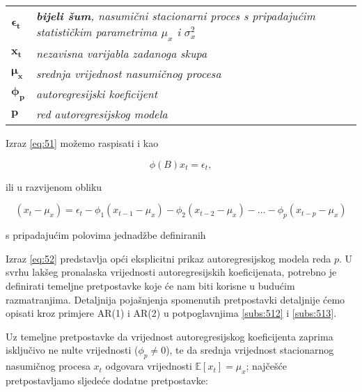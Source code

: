 \documentclass[a4paper,12pt,oneside]{memoir}
\begin{document}
            \begin{table}[H]
                \centering
                \begin{tabular*}{0.9\textwidth}{>{\bfseries}l p{13cm}}
                    \textit{\textbf{$\boldsymbol{\epsilon_t}$}} & \textit{\textbf{bijeli šum}, nasumični stacionarni proces s pripadajućim statističkim parametrima $\mu_x$ i $\sigma_x^2$}\\
                    \textit{\textbf{$\boldsymbol{x_t}$}} & \textit{nezavisna varijabla zadanoga skupa}\\
                    \textit{\textbf{$\boldsymbol{\mu_x}$}} & \textit{srednja vrijednost nasumičnog procesa}\\
                    \textit{\textbf{$\boldsymbol{\phi_p}$}} & \textit{autoregresijski koeficijent}\\
                    \textit{\textbf{$\boldsymbol{p}$}} & \textit{red autoregresijskog modela}\\
                \end{tabular*}
            \end{table}

            Izraz \ref{eq:51} možemo raspisati i kao

            \begin{equation}
                \phi(B)x_t=\epsilon_t,
            \end{equation}

            ili u razvijenom obliku

            \begin{equation}
                (x_t-\mu_x)=\epsilon_t-\phi_1(x_{t-1}-\mu_x)-\phi_2(x_{t-2}-\mu_x)-\ldots-\phi_p(x_{t-p}-\mu_x)
                \label{eq:52}
            \end{equation}

            s pripadajućim polovima jednadžbe definiranih

            Izraz \ref{eq:52} predstavlja opći eksplicitni prikaz autoregresijskog modela reda $p$. U svrhu lakšeg pronalaska vrijednosti autoregresijskih koeficijenata, potrebno je definirati temeljne pretpostavke koje će nam biti korisne u budućim razmatranjima. Detaljnija pojašnjenja spomenutih pretpostavki detaljnije ćemo opisati kroz primjere AR(1) i AR(2) u potpoglavnjima \ref{subs:512} i \ref{subs:513}.
            
            Uz temeljne pretpostavke da vrijednost autoregresijskog koeficijenta zaprima isključivo ne nulte vrijednosti ($\phi_p\neq0$), te da srednja vrijednost stacionarnog nasumičnog procesa $x_t$ odgovara vrijednosti $\mathbb{E}[x_t]=\mu_x$; najčešće pretpostavljamo sljedeće dodatne pretpostavke:
\end{document}
